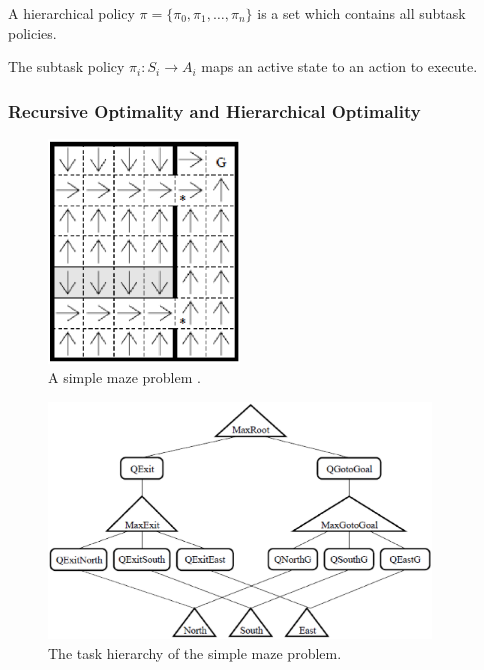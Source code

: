 \begin{definition}
A hierarchical policy $\pi = \{\pi_0, \pi_1, \dots, \pi_n\}$ is a set which contains all subtask policies. 
\end{definition}
The subtask policy $\pi_i: S_i \rightarrow A_i$ maps an active state to an action to execute.




\subsubsection{Recursive Optimality and Hierarchical Optimality}
\label{se:ROHO}
\begin{figure}[t]
\begin{center}
    \includegraphics[width=2in] {./figures/Maze.eps}
\end{center}
\caption{A simple maze problem \cite{MaxQJ}.}
\label{fig:Maze}
\end{figure}
\begin{figure}[t]
\begin{center}
    \includegraphics[width=4in] {./figures/MazeH.eps}
\end{center}
\caption{The task hierarchy of the simple maze problem.}
\label{fig:MazeH}
\end{figure}

